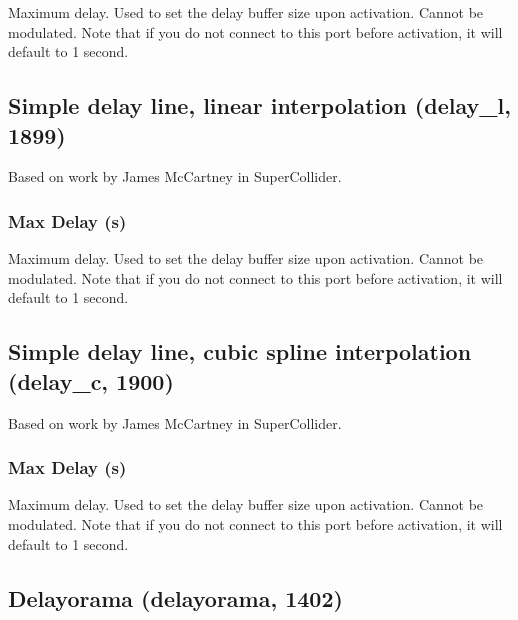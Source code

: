 \documentclass[11pt]{article}
\begin{document}
       Maximum delay. Used to set the delay buffer size upon activation. Cannot
       be modulated. Note that if you do not connect to this port before
       activation, it will default to 1 second. 
      \subsection{Simple delay line, linear interpolation (delay\_l, 1899)\label{delay_l}\label{id1899}}
Based on work by James McCartney in SuperCollider.\subsubsection*{Max Delay (s)}

       Maximum delay. Used to set the delay buffer size upon activation. Cannot
       be modulated. Note that if you do not connect to this port before
       activation, it will default to 1 second. 
      \subsection{Simple delay line, cubic spline interpolation (delay\_c, 1900)\label{delay_c}\label{id1900}}
Based on work by James McCartney in SuperCollider.\subsubsection*{Max Delay (s)}

       Maximum delay. Used to set the delay buffer size upon activation. Cannot
       be modulated. Note that if you do not connect to this port before
       activation, it will default to 1 second. 
      \subsection{Delayorama (delayorama, 1402)\label{delayorama}\label{id1402}}
\end{document}
